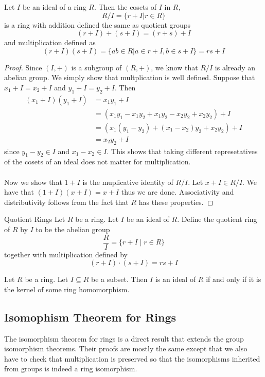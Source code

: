 \documentclass[a4paper]{article}
\begin{document}
\begin{prp}{}{} Let $I$ be an ideal of a ring $R$. Then the cosets of $I$ in $R$, $$R/I=\{r+I|r\in R\}$$ is a ring with addition defined the same as quotient groups $$(r+I)+(s+I)=(r+s)+I$$ and multiplication defined as $$(r+I)(s+I)=\{ab\in R|a\in r+I,b\in s+I\}=rs+I$$ \tcbline
\begin{proof}
Since $(I,+)$ is a subgroup of $(R,+)$, we know that $R/I$ is already an abelian group. We simply show that multplication is well defined. Suppose that $x_1+I=x_2+I$ and $y_1+I=y_2+I$. Then 
\begin{align*}
(x_1+I)(y_1+I)&=x_1y_1+I\\
&=(x_1y_1-x_1y_2+x_1y_2-x_2y_2+x_2y_2)+I\\
&=(x_1(y_1-y_2)+(x_1-x_2)y_2+x_2y_2)+I\\
&=x_2y_2+I
\end{align*}
since $y_1-y_2\in I$ and $x_1-x_2\in I$. This shows that taking different represetatives of the cosets of an ideal does not matter for multiplication. \\~\\
Now we show that $1+I$ is the muplicative identity of $R/I$. Let $x+I\in R/I$. We have that $(1+I)(x+I)=x+I$ thus we are done. Associativity and distributivity follows from the fact that $R$ has these properties. 
\end{proof}
\end{prp}

\begin{defn}{Quotient Rings}{} Let $R$ be a ring. Let $I$ be an ideal of $R$. Define the quotient ring of $R$ by $I$ to be the abelian group $$\frac{R}{I}=\{r+I\;|\;r\in R\}$$ together with multiplication defined by $$(r+I)\cdot(s+I)=rs+I$$
\end{defn}

\begin{prp}{}{} Let $R$ be a ring. Let $I\subseteq R$ be a subset. Then $I$ is an ideal of $R$ if and only if it is the kernel of some ring homomorphism. 
\end{prp}

\subsection{Isomophism Theorem for Rings}
The isomorphism theorem for rings is a direct result that extends the group isomorphism theorems. Their proofs are mostly the same except that we also have to check that multiplication is preserved so that the isomorphisms inherited from groups is indeed a ring isomorphism. 
\end{document}
